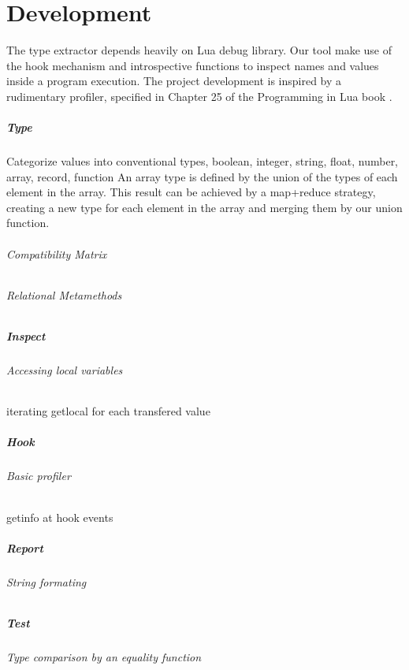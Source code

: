 
\chapter{Development}
\label{cha:Development}
The type extractor depends heavily on Lua debug library. Our tool make use of the hook mechanism and introspective functions to inspect names and values inside a program execution. The project development is inspired by a rudimentary profiler, specified in Chapter 25 of the Programming in Lua book \cite{ierusalimschy_programming_2016}.
\paragraph*{Type}
Categorize values into conventional types, boolean, integer, string, float, number, array, record, function
An array type is defined by the union of the types of each element in the array. This result can be achieved by a map+reduce strategy, creating a new type for each element in the array and merging them by our union function.
\subparagraph*{Compatibility Matrix}
\subparagraph*{Relational Metamethods}
\paragraph*{Inspect}
\subparagraph*{Accessing local variables}
iterating getlocal for each transfered value
\paragraph*{Hook}
\subparagraph*{Basic profiler}
getinfo at hook events
\paragraph*{Report}
\subparagraph*{String formating}
\paragraph*{Test}
\subparagraph*{Type comparison by an equality function}



